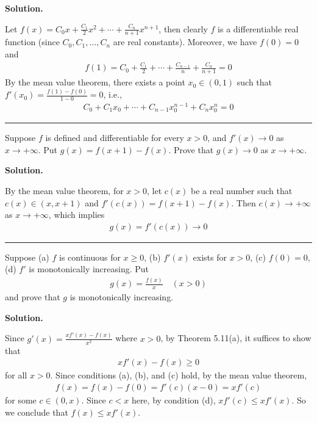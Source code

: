 \documentclass[12pt]{article}
\theoremstyle{definition}
\begin{document}
\smallskip
\noindent\textbf{Solution.}\quad

Let $f(x)=C_0x+\frac{C_1}{2}x^2+\cdots+\frac{C_n}{n+1}x^{n+1}$, then clearly $f$ is a differentiable real function (since $C_0,C_1,\ldots,C_n$ are real constants). Moreover, we have $f(0)=0$ and
\begin{align*}
f(1)=C_0+\frac{C_1}{2}+\cdots+\frac{C_{n-1}}{n}+\frac{C_n}{n+1}=0
\end{align*}
By the mean value theorem, there exists a point $x_0\in(0,1)$ such that $f'(x_0)=\frac{f(1)-f(0)}{1-0}=0$, i.e.,
\begin{align*}
C_0+C_1x_0+\cdots+C_{n-1}x_0^{n-1}+C_nx_0^n=0
\end{align*}



\bigskip\noindent\hrule\bigskip

Suppose $f$ is defined and differentiable for every $x>0$, and $f'(x)\to 0$ as $x\to+\infty$. Put $g(x)=f(x+1)-f(x)$. Prove that $g(x)\to 0$ as $x\to+\infty$.

\smallskip
\noindent\textbf{Solution.}\quad

By the mean value theorem, for $x>0$, let $c(x)$ be a real number such that $c(x)\in(x,x+1)$ and $f'(c(x))=f(x+1)-f(x)$. Then $c(x)\to+\infty$ as $x\to+\infty$, which implies
\begin{align*}
g(x)=f'(c(x))\to 0
\end{align*}



\bigskip\noindent\hrule\bigskip

Suppose
(a) $f$ is continuous for $x\ge 0$,
(b) $f'(x)$ exists for $x>0$,
(c) $f(0)=0$,
(d) $f'$ is monotonically increasing.
Put
\begin{align*}
g(x)=\frac{f(x)}{x}\quad(x>0)
\end{align*}
and prove that $g$ is monotonically increasing.

\smallskip
\noindent\textbf{Solution.}\quad

Since $g'(x)=\frac{xf'(x)-f(x)}{x^2}$ where $x>0$, by Theorem 5.11(a), it suffices to show that 
\begin{align*}
xf'(x)-f(x)\ge 0
\end{align*}
for all $x>0$. Since conditions (a), (b), and (c) hold, by the mean value theorem,
\begin{align*}
f(x)=f(x)-f(0)=f'(c)(x-0)=xf'(c)
\end{align*}
for some $c\in(0,x)$. Since $c<x$ here, by condition (d), $xf'(c)\le xf'(x)$. So we conclude that $f(x)\le xf'(x)$.
\end{document}
